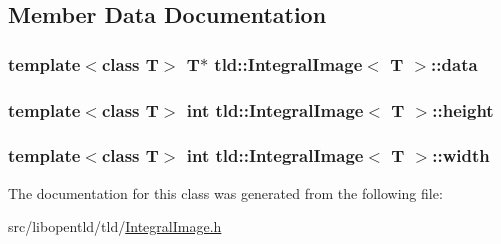 \subsection{Member Data Documentation}
\hypertarget{classtld_1_1_integral_image_a671be18d2f3a30aa1aea12d63a787e48}{
\subsubsection[{data}]{\setlength{\rightskip}{0pt plus 5cm}template$<$class T$>$ T$\ast$ {\bf tld::IntegralImage}$<$ T $>$::{\bf data}}}
\label{classtld_1_1_integral_image_a671be18d2f3a30aa1aea12d63a787e48}
\hypertarget{classtld_1_1_integral_image_ad5f65eee66dc3ba0d8f0462f858c1e99}{
\subsubsection[{height}]{\setlength{\rightskip}{0pt plus 5cm}template$<$class T$>$ int {\bf tld::IntegralImage}$<$ T $>$::{\bf height}}}
\label{classtld_1_1_integral_image_ad5f65eee66dc3ba0d8f0462f858c1e99}
\hypertarget{classtld_1_1_integral_image_af8ea5fee24e9726087c0e9f6159141e8}{
\subsubsection[{width}]{\setlength{\rightskip}{0pt plus 5cm}template$<$class T$>$ int {\bf tld::IntegralImage}$<$ T $>$::{\bf width}}}
\label{classtld_1_1_integral_image_af8ea5fee24e9726087c0e9f6159141e8}


The documentation for this class was generated from the following file:\begin{DoxyCompactItemize}
\item 
src/libopentld/tld/\hyperlink{_integral_image_8h}{IntegralImage.h}\end{DoxyCompactItemize}

